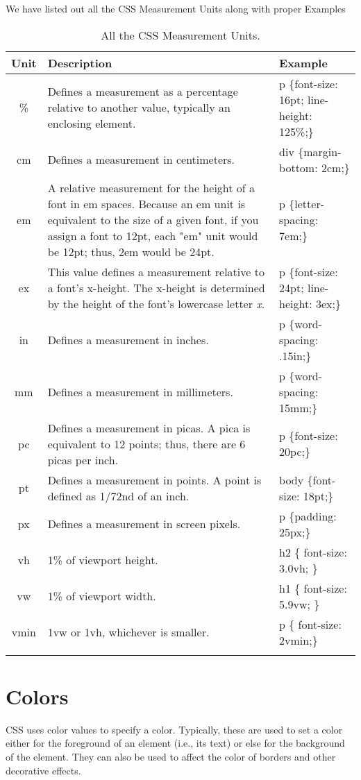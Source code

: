 \documentclass[a4paper,oneside]{book}
\numberwithin{equation}{chapter}
\begin{document}
We have listed out all the CSS Measurement Units along with proper Examples
\begin{center}
\begin{longtable}{|c|p{6cm}|p{4cm}|}
\hline
\textbf{Unit} & \textbf{Description} & \textbf{Example}\\
\hline
\% & Defines a measurement as a percentage relative to another value, typically an enclosing element. & p \{font-size: 16pt; line-height: 125\%;\} \\
\hline
cm & Defines a measurement in centimeters. & div \{margin-bottom: 2cm;\}\\
\hline
em & A relative measurement for the height of a font in em spaces. Because an em unit is equivalent to the size of a given font, if you assign a font to 12pt, each "em" unit would be 12pt; thus, 2em would be 24pt. & p \{letter-spacing: 7em;\}\\
\hline
ex & This value defines a measurement relative to a font's x-height. The x-height is determined by the height of the font's lowercase letter \textit{x}.& p \{font-size: 24pt; line-height: 3ex;\}\\
\hline
in & Defines a measurement in inches. & p \{word-spacing: .15in;\}\\
\hline
mm & Defines a measurement in millimeters. & p \{word-spacing: 15mm;\}\\
\hline
pc & Defines a measurement in picas. A pica is equivalent to 12 points; thus, there are 6 picas per inch. & p \{font-size: 20pc;\}\\
\hline
pt & Defines a measurement in points. A point is defined as 1/72nd of an inch. & body \{font-size: 18pt;\}\\
\hline
px & Defines a measurement in screen pixels. & p \{padding: 25px;\}\\
\hline
vh & 1\% of viewport height. & h2 \{ font-size: 3.0vh; \}\\
\hline
vw & 1\% of viewport width. & h1 \{ font-size: 5.9vw; \}\\
\hline
vmin & 1vw or 1vh, whichever is smaller. & p \{ font-size: 2vmin;\}\\
\hline
\caption{All the CSS Measurement Units.} 
\end{longtable}
\end{center}
\section{Colors}
CSS uses color values to specify a color. Typically, these are used to set a color either for the foreground of an element (i.e., its text) or else for the background of the element. They can also be used to affect the color of borders and other decorative effects.
\end{document}

